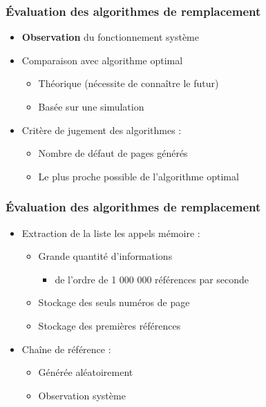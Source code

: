 \begin{frame}
\frametitle{Évaluation des algorithmes de remplacement}
\begin{itemize}
\item \textbf{Observation} du fonctionnement système
\item Comparaison avec algorithme optimal
\begin{itemize}
\item Théorique (nécessite de connaître le futur)
\item Basée sur une simulation
\end{itemize}
\item Critère de jugement des algorithmes :
\begin{itemize}
\item Nombre de défaut de pages générés
\item Le plus proche possible de l'algorithme optimal
\end{itemize}
\end{itemize}
\end{frame}


\begin{frame}
\frametitle{Évaluation des algorithmes de remplacement}
\begin{itemize}
\item Extraction de la liste les appels mémoire :
\begin{itemize}
\item Grande quantité d'informations
\begin{itemize}
\item de l'ordre de 1 000 000 références par seconde
\end{itemize}
\item Stockage des seuls numéros de page
\item Stockage des premières références
\end{itemize}
\item Chaîne de référence :
\begin{itemize}
\item Générée aléatoirement 
\item Observation système
\end{itemize}
\end{itemize}
\end{frame}


